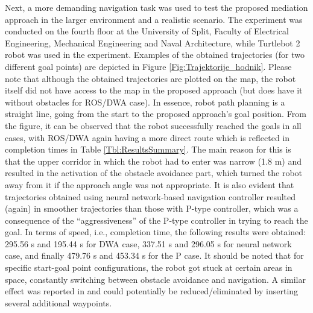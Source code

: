 Next, a more demanding navigation task was used to test the proposed mediation approach in the larger environment and a realistic scenario. The experiment was conducted on the fourth floor at the University of Split, Faculty of Electrical Engineering, Mechanical Engineering and Naval Architecture, while Turtlebot 2 robot was used in the experiment. Examples of the obtained trajectories (for two different goal points) are depicted in Figure \ref{Fig:Trajektorije_hodnik}. Please note that although the obtained trajectories are plotted on the map, the robot itself did not have access to the map in the proposed approach (but does have it without obstacles for ROS/DWA case). In essence, robot path planning is a straight line, going from the start to the proposed approach's goal position. From the figure, it can be observed that the robot successfully reached the goals in all cases, with ROS/DWA again having a more direct route which is reflected in completion times in Table \ref{Tbl:ResultsSummary}. The main reason for this is that the upper corridor in which the robot had to enter was narrow (1.8 m) and resulted in the activation of the obstacle avoidance part, which turned the robot away from it if the approach angle was not appropriate. It is also evident that trajectories obtained using neural network-based navigation controller resulted (again) in smoother trajectories than those with P-type controller, which was a consequence of the ``aggressiveness'' of the P-type controller in trying to reach the goal. In terms of speed, i.e., completion time, the following results were obtained: 295.56 s and 195.44 s for DWA case, 337.51 s and 296.05 s for neural network case, and finally 479.76 s and 453.34 s for the P case. It should be noted that for specific start-goal point configurations, the robot got stuck at certain areas in space, constantly switching between obstacle avoidance and navigation. A similar effect was reported in \cite{Pfeiffer2017} and could potentially be reduced/eliminated by inserting several additional waypoints.

